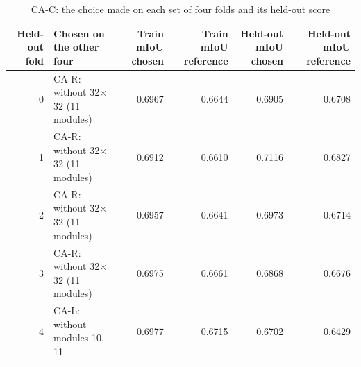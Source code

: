 \begin{table}[H]\centering\scriptsize\setlength{\tabcolsep}{3pt}
\begin{tabular}{r>{\raggedright\arraybackslash}p{1.40cm}rrrr}
\toprule
Held-out fold & Chosen on the other four & Train mIoU chosen & Train mIoU reference & Held-out mIoU chosen & Held-out mIoU reference \\
\midrule
0 & CA-R: without 32$\times$32 (11 modules) & 0.6967 & 0.6644 & 0.6905 & 0.6708 \\
1 & CA-R: without 32$\times$32 (11 modules) & 0.6912 & 0.6610 & 0.7116 & 0.6827 \\
2 & CA-R: without 32$\times$32 (11 modules) & 0.6957 & 0.6641 & 0.6973 & 0.6714 \\
3 & CA-R: without 32$\times$32 (11 modules) & 0.6975 & 0.6661 & 0.6868 & 0.6676 \\
4 & CA-L: without modules 10, 11 & 0.6977 & 0.6715 & 0.6702 & 0.6429 \\
\bottomrule
\end{tabular}
\caption{CA-C: the choice made on each set of four folds and its held-out score}\label{tab:a3_ca_c_folds}
\end{table}
